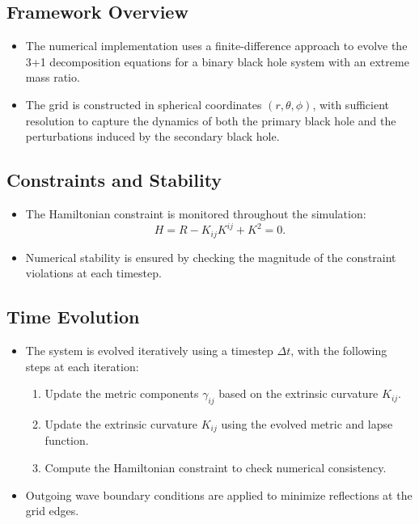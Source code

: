 \documentclass[12pt]{article}
\begin{document}
\subsection{Framework Overview}
\begin{itemize}
    \item The numerical implementation uses a finite-difference approach to evolve the 3+1 decomposition equations for a binary black hole system with an extreme mass ratio.
    \item The grid is constructed in spherical coordinates $(r, \theta, \phi)$, with sufficient resolution to capture the dynamics of both the primary black hole and the perturbations induced by the secondary black hole.
\end{itemize}

\subsection{Constraints and Stability}
\begin{itemize}
    \item The Hamiltonian constraint is monitored throughout the simulation:
    \[
    H = R - K_{ij} K^{ij} + K^2 = 0.
    \]
    \item Numerical stability is ensured by checking the magnitude of the constraint violations at each timestep.
\end{itemize}

\subsection{Time Evolution}
\begin{itemize}
    \item The system is evolved iteratively using a timestep $\Delta t$, with the following steps at each iteration:
    \begin{enumerate}
        \item Update the metric components $\gamma_{ij}$ based on the extrinsic curvature $K_{ij}$.
        \item Update the extrinsic curvature $K_{ij}$ using the evolved metric and lapse function.
        \item Compute the Hamiltonian constraint to check numerical consistency.
    \end{enumerate}
    \item Outgoing wave boundary conditions are applied to minimize reflections at the grid edges.
\end{itemize}
\end{document}

